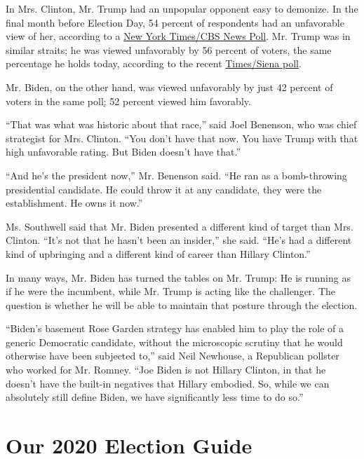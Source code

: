 In Mrs. Clinton, Mr. Trump had an unpopular opponent easy to demonize.
In the final month before Election Day, 54 percent of respondents had an
unfavorable view of her, according to a
\href{https://www.nytimes3xbfgragh.onion/interactive/2016/11/03/us/politics/poll-times-cbs-news.html}{New
York Times/CBS News Poll}. Mr. Trump was in similar straits; he was
viewed unfavorably by 56 percent of voters, the same percentage he holds
today, according to the recent
\href{https://www.nytimes3xbfgragh.onion/2020/06/24/us/politics/trump-biden-poll-nyt-upshot-siena-college.html}{Times/Siena
poll}.

Mr. Biden, on the other hand, was viewed unfavorably by just 42 percent
of voters in the same
poll\href{-https:/www.nytimes3xbfgragh.onion/2020/06/24/us/politics/trump-biden-poll-nyt-upshot-siena-college.html}{;}
52 percent viewed him favorably.

``That was what was historic about that race,'' said Joel Benenson, who
was chief strategist for Mrs. Clinton. ``You don't have that now. You
have Trump with that high unfavorable rating. But Biden doesn't have
that.''

``And he's the president now,'' Mr. Benenson said. ``He ran as a
bomb-throwing presidential candidate. He could throw it at any
candidate, they were the establishment. He owns it now.''

Ms. Southwell said that Mr. Biden presented a different kind of target
than Mrs. Clinton. ``It's not that he hasn't been an insider,'' she
said. ``He's had a different kind of upbringing and a different kind of
career than Hillary Clinton.''

In many ways, Mr. Biden has turned the tables on Mr. Trump: He is
running as if he were the incumbent, while Mr. Trump is acting like the
challenger. The question is whether he will be able to maintain that
posture through the election.

``Biden's basement Rose Garden strategy has enabled him to play the role
of a generic Democratic candidate, without the microscopic scrutiny that
he would otherwise have been subjected to,'' said Neil Newhouse, a
Republican pollster who worked for Mr. Romney. ``Joe Biden is not
Hillary Clinton, in that he doesn't have the built-in negatives that
Hillary embodied. So, while we can absolutely still define Biden, we
have significantly less time to do so.''

\hypertarget{our-2020-election-guide}{%
\section{Our 2020 Election Guide}\label{our-2020-election-guide}}

